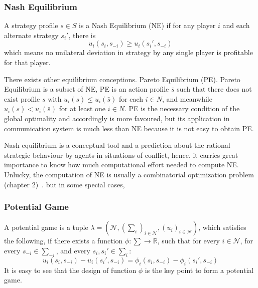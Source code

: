 \subsubsection{Nash Equilibrium}

A strategy profile $s\in S$ is a Nash Equilibrium (NE) if for any player $i$ and each alternate strategy $s_i'$, there is
 \[ u_i(s_i, s_{-i}) \geq u_i(s_i', s_{-i})\]
which means no unilateral deviation in strategy by any single player is profitable for that player.


There exists other equilibrium conceptions. \ie Pareto Equilibrium (PE). 
Pareto Equilibrium is a subset of NE, PE is an action profile $\bar{s}$ such that there does not exist profile $s$ with $u_i(s)\leq u_i(\bar{s})$ for each $i\in N$, and meanwhile $u_i(s)< u_i(\bar{s})$ for at least one $i\in N$.
PE is the necessary condition of the global optimality and accordingly is more favoured, but its application in communication system is much less than NE because it is not easy to obtain PE.

Nash equilibrium is a conceptual tool and a prediction about the rational strategic behaviour by agents in situations of conflict, hence, it carries great importance to know how much computational effort needed to compute NE.
Unlucky, the computation of NE is usually a combinatorial optimization problem (chapter 2)~\cite{}.
 but in some special cases, 


\subsubsection{Potential Game}

A potential game is a tuple $\lambda=(\mathcal{N},(\sum_i)_{i \in \mathcal{N}},(u_i)_{i\in \mathcal{N}})$, which satisfies the following, if there exists a function $\phi: \sum\rightarrow \mathbb{R}$, such that for every $i\in \mathcal{N}$, for every $s_{-i}\in \sum_{-i}$, and every $s_i, s_i'\in \sum_i$:
 \[ u_i(s_i, s_{-i})-u_i(s_i', s_{-i}) = \phi_i(s_i, s_{-i})-\phi_i(s_i', s_{-i})\]
It is easy to see that the design of function $\phi$ is the key point to form a potential game.



